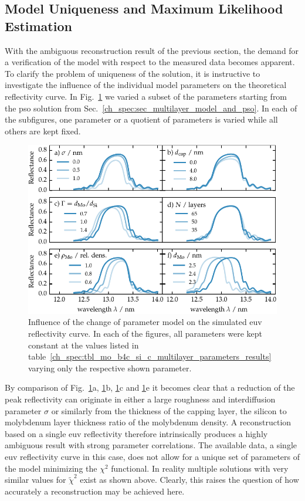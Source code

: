 \subsection{Model Uniqueness and Maximum Likelihood Estimation} \label{ch_spec:sec_maximum_likelihood}
With the ambiguous reconstruction result of the previous section, the demand for a verification of the model with respect to the measured data becomes apparent. To clarify the problem of uniqueness of the solution, it is instructive to investigate the influence of the individual model parameters on the theoretical reflectivity curve. In Fig.~\ref{ch_spec:fig_mo_si_parameter_influence} we varied a subset of the parameters starting from the \gls{pso} solution from Sec.~\ref{ch_spec:sec_multilayer_model_and_pso}. In each of the subfigures, one parameter or a quotient of parameters is varied while all others are kept fixed.
\begin{figure}[htbp]
\centering
\includegraphics{img/parameter_influence}
\caption{Influence of the change of parameter model on the simulated \gls{euv} reflectivity curve. In each of the figures, all parameters were kept constant at the values listed in table~\ref{ch_spec:tbl_mo_b4c_si_c_multilayer_parameters_results} varying only the respective shown parameter.}
\label{ch_spec:fig_mo_si_parameter_influence}
\end{figure}
By comparison of Fig.~\ref{ch_spec:fig_mo_si_parameter_influence}a, \ref{ch_spec:fig_mo_si_parameter_influence}b, \ref{ch_spec:fig_mo_si_parameter_influence}c and \ref{ch_spec:fig_mo_si_parameter_influence}e it becomes clear that a reduction of the peak reflectivity can originate in either a large roughness and interdiffusion parameter $\sigma$ or similarly from the thickness of the capping layer, the silicon to molybdenum layer thickness ratio of the molybdenum density. A reconstruction based on a single \gls{euv} reflectivity therefore intrinsically produces a highly ambiguous result with strong parameter correlations. The available data, a single \gls{euv} reflectivity curve in this case, does not allow for a unique set of parameters of the model minimizing the $\chi^2$ functional. In reality multiple solutions with very similar values for $\tilde{\chi}^2$ exist as shown above. Clearly, this raises the question of how accurately a reconstruction may be achieved here.

